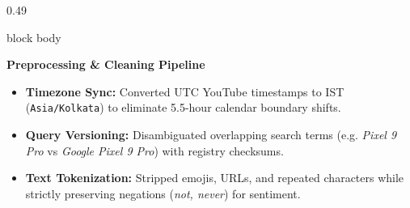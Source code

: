 \documentclass[aspectratio=169, 10pt]{beamer}
\newenvironment{card}[1][]{%
        \begin{beamercolorbox}[rounded=true,shadow=false,wd=\linewidth,sep=3.5pt,#1]{block body}%
        \fontsize{7.8pt}{9.8pt}\selectfont%
    }{%
        \end{beamercolorbox}%
    }
\begin{document}
\begin{frame}[t]
\begin{columns}[T]
            \begin{column}{0.49\textwidth}                                                                                                                                                             
                \begin{card}                                                                                                                                                                           
                    {\fontsize{8pt}{9.5pt}\selectfont \textbf{\color{BlueAccent}Preprocessing \& Cleaning Pipeline}}\\[0.06cm]                                                                         
                    \begin{itemize}\setlength{\itemsep}{2pt}                                                                                                                                           
                        \item \textbf{Timezone Sync:} Converted UTC YouTube timestamps to IST (\texttt{Asia/Kolkata}) to eliminate 5.5-hour calendar boundary shifts.                                  
                        \item \textbf{Query Versioning:} Disambiguated overlapping search terms (e.g. \textit{Pixel 9 Pro} vs \textit{Google Pixel 9 Pro}) with registry checksums.                    
                        \item \textbf{Text Tokenization:} Stripped emojis, URLs, and repeated characters while strictly preserving negations (\textit{not, never}) for sentiment.                      
                    \end{itemize}                                                                                                                                                                      
                \end{card}                                                                                                                                                                             
            \end{column}                                                                                                                                                                               
        \end{columns}                                                                                                                                                                                  

\end{frame}
\end{document}
